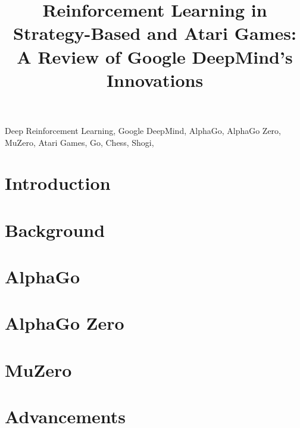 \documentclass[conference]{IEEEtran}
\begin{document}
\title{Reinforcement Learning in Strategy-Based and Atari Games: A Review of Google DeepMind's Innovations\\}



\maketitle

\begin{abstract}

    

\end{abstract}

\begin{IEEEkeywords}
    Deep Reinforcement Learning, Google DeepMind, AlphaGo, AlphaGo Zero, MuZero, Atari Games, Go, Chess, Shogi,
\end{IEEEkeywords}

\section{Introduction}


\section{Background}


\section{AlphaGo}


\section{AlphaGo Zero}


\section{MuZero}


\section{Advancements}

\end{document}
